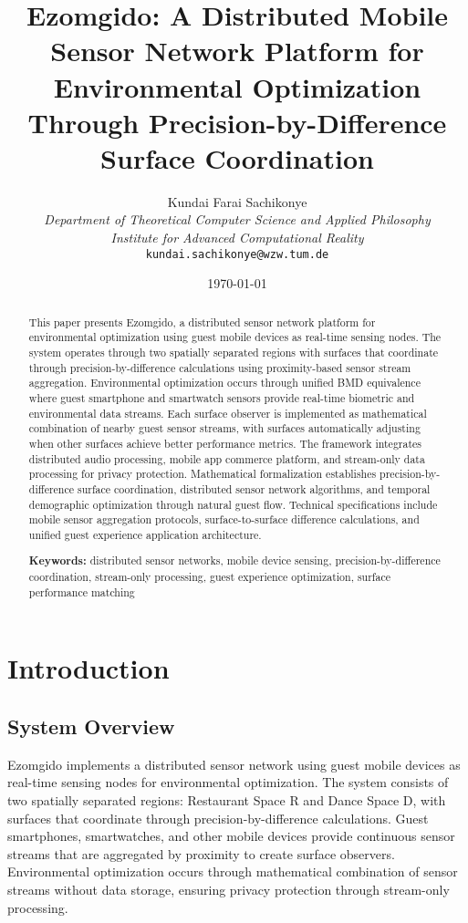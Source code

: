 \documentclass[12pt,a4paper]{article}
\title{\textbf{Ezomgido: A Distributed Mobile Sensor Network Platform for Environmental Optimization Through Precision-by-Difference Surface Coordination}}
\author{
Kundai Farai Sachikonye\\
\textit{Department of Theoretical Computer Science and Applied Philosophy}\\
\textit{Institute for Advanced Computational Reality}\\
\texttt{kundai.sachikonye@wzw.tum.de}
}
\date{\today}
\begin{document}
\maketitle

\begin{abstract}
This paper presents Ezomgido, a distributed sensor network platform for environmental optimization using guest mobile devices as real-time sensing nodes. The system operates through two spatially separated regions with surfaces that coordinate through precision-by-difference calculations using proximity-based sensor stream aggregation. Environmental optimization occurs through unified BMD equivalence where guest smartphone and smartwatch sensors provide real-time biometric and environmental data streams. Each surface observer is implemented as mathematical combination of nearby guest sensor streams, with surfaces automatically adjusting when other surfaces achieve better performance metrics. The framework integrates distributed audio processing, mobile app commerce platform, and stream-only data processing for privacy protection. Mathematical formalization establishes precision-by-difference surface coordination, distributed sensor network algorithms, and temporal demographic optimization through natural guest flow. Technical specifications include mobile sensor aggregation protocols, surface-to-surface difference calculations, and unified guest experience application architecture.

\textbf{Keywords:} distributed sensor networks, mobile device sensing, precision-by-difference coordination, stream-only processing, guest experience optimization, surface performance matching
\end{abstract}

\tableofcontents

\section{Introduction}

\subsection{System Overview}

Ezomgido implements a distributed sensor network using guest mobile devices as real-time sensing nodes for environmental optimization. The system consists of two spatially separated regions: Restaurant Space R and Dance Space D, with surfaces that coordinate through precision-by-difference calculations. Guest smartphones, smartwatches, and other mobile devices provide continuous sensor streams that are aggregated by proximity to create surface observers. Environmental optimization occurs through mathematical combination of sensor streams without data storage, ensuring privacy protection through stream-only processing.
\end{document}
